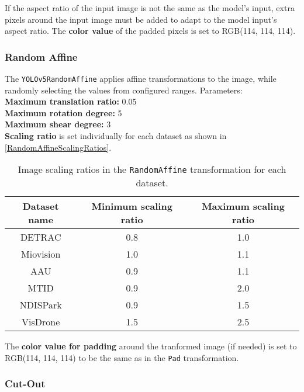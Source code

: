 If the aspect ratio of the input image is not the same as the model's input, extra pixels around the input image must be added
to adapt to the model input's aspect ratio. The \textbf{color value} of the padded pixels is set to RGB(114, 114, 114).

\subsubsection*{Random Affine}

The \texttt{YOLOv5RandomAffine} applies affine transformations to the image,
while randomly selecting the values from configured ranges. Parameters:\\
\textbf{Maximum translation ratio:} 0.05 \\
\textbf{Maximum rotation degree:} 5 \\
\textbf{Maximum shear degree:} 3 \\
\textbf{Scaling ratio} is set individually for each dataset as shown in \autoref{RandomAffineScalingRatios}.

\begin{table}[h]
    \centering
    \begin{threeparttable}
        \begin{tabular}{|c|c|c|}
            \hline
            Dataset name & Minimum scaling ratio & Maximum scaling ratio \\
            \hline
            DETRAC       & 0.8 & 1.0 \\
            Miovision    & 1.0 & 1.1 \\
            AAU          & 0.9 & 1.1 \\
            MTID         & 0.9 & 2.0 \\
            NDISPark     & 0.9 & 1.5 \\
            VisDrone     & 1.5 & 2.5 \\
            \hline
        \end{tabular}
        \caption{Image scaling ratios in the \texttt{RandomAffine} transformation for each dataset.}
        \label{RandomAffineScalingRatios}
    \end{threeparttable}
\end{table}

The \textbf{color value for padding} around the tranformed image (if needed)
is set to RGB(114, 114, 114) to be the same as in the \texttt{Pad} transformation.

\subsubsection*{Cut-Out}

